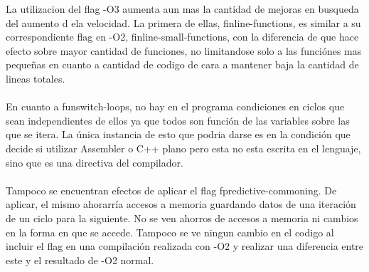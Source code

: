 La utilizacion del flag -O3 aumenta aun mas la cantidad de mejoras en busqueda del aumento d ela velocidad. La primera de ellas, finline-functions, es similar a su correspondiente flag en -O2, finline-small-functions, con la diferencia de que hace efecto sobre mayor cantidad de funciones, no limitandose solo a las funciónes mas pequeñas en cuanto a cantidad de codigo de cara a mantener baja la cantidad de lineas totales.
~\\
~\\
En cuanto a funswitch-loops, no hay en el programa condiciones en ciclos que sean independientes de ellos ya que todos son función de las variables sobre las que se itera. La única instancia de esto que podria darse es en la condición que decide si utilizar Assembler o C++ plano pero esta no esta escrita en el lenguaje, sino que es una directiva del compilador.
~\\
~\\
Tampoco se encuentran efectos de aplicar el flag fpredictive-commoning. De aplicar, el mismo ahorarría accesos a memoria guardando datos de una iteración de un ciclo para la siguiente. No se ven ahorros de accesos a memoria ni cambios en la forma en que se accede. Tampoco se ve ningun cambio en el codigo al incluir el flag en una compilación realizada con -O2 y realizar una diferencia entre este y el resultado de -O2 normal.




\newpage



